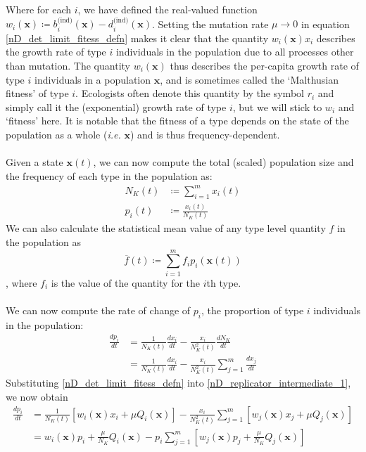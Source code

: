 Where for each $i$, we have defined the real-valued function $w_i(\mathbf{x}) \coloneqq b^{\textrm{(ind)}}_{i}(\mathbf{x}) - d^{\textrm{(ind)}}_{i}(\mathbf{x})$. Setting the mutation rate $\mu \to 0$ in equation \eqref{nD_det_limit_fitess_defn} makes it clear that the quantity $w_i(\mathbf{x})x_i$ describes the growth rate of type $i$ individuals in the population due to all processes other than mutation. The quantity $w_i(\mathbf{x})$ thus describes the per-capita growth rate of type $i$ individuals in a population $\mathbf{x}$, and is sometimes called the `Malthusian fitness' of type $i$. Ecologists often denote this quantity by the symbol $r_i$ and simply call it the (exponential) growth rate of type $i$, but we will stick to $w_i$ and `fitness' here. It is notable that the fitness of a type depends on the state of the population as a whole (\textit{i.e.} $\mathbf{x}$) and is thus frequency-dependent.\\
\\
Given a state $\mathbf{x}(t)$, we can now compute the total (scaled) population size and the frequency of each type in the population as:
\begin{equation}
\label{nD_tot_pop_and_prop_inds_defn}
\begin{aligned}
N_{K}(t) &\coloneqq \sum\limits_{i=1}^{m}x_i(t)\\
p_i(t) &\coloneqq \frac{x_i(t)}{N_{K}(t)}
\end{aligned}
\end{equation}
We can also calculate the statistical mean value of any type level quantity $f$ in the population as
\begin{equation}
\label{nD_mean}
\overline{f}(t) \coloneqq \sum\limits_{i=1}^{m}f_ip_{i}(\mathbf{x}(t))
\end{equation}
, where $f_i$ is the value of the quantity for the $i$th type.\\
\\
We can now compute the rate of change of $p_i$, the proportion of type $i$ individuals in the population:
\begin{align}
\frac{dp_i}{dt} &= \frac{1}{N_{K}(t)}\frac{dx_i}{dt} - \frac{x_i}{N_{K}^2(t)}\frac{dN_{K}}{dt}\nonumber\\
&= \frac{1}{N_{K}(t)}\frac{dx_i}{dt} - \frac{x_i}{N_{K}^2(t)}\sum\limits_{j=1}^{m}\frac{dx_j}{dt}\label{nD_replicator_intermediate_1}
\end{align}
Substituting \eqref{nD_det_limit_fitess_defn} into \eqref{nD_replicator_intermediate_1}, we now obtain
\begin{align*}
\frac{dp_i}{dt} &=  \frac{1}{N_{K}(t)}\left[w_i(\mathbf{x})x_i + \mu Q_i(\mathbf{x})\right] - \frac{x_i}{N_{K}^2(t)}\sum\limits_{j=1}^{m}\left[w_j(\mathbf{x})x_j + \mu Q_j(\mathbf{x})\right]\\
&= w_i(\mathbf{x})p_i + \frac{\mu}{N_K}Q_i(\mathbf{x}) - p_i\sum\limits_{j=1}^{m}\left[w_j(\mathbf{x})p_j + \frac{\mu}{N_K}Q_j(\mathbf{x})\right]
\end{align*}
